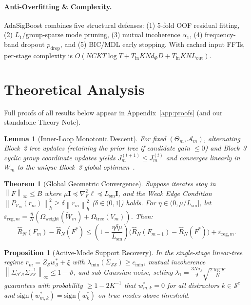 \documentclass[10pt]{article}
\newtheorem{theorem}{Theorem}
\newtheorem{lemma}{Lemma}
\newtheorem{proposition}{Proposition}
\newcommand{\norm}[1]{\left\lVert #1 \right\rVert}
\begin{document}
\paragraph{Anti-Overfitting \& Complexity.} AdaSigBoost combines five structural defenses: (1) 5-fold OOF residual fitting, (2) $L_1$/group-sparse mode pruning, (3) mutual incoherence $\alpha_1$, (4) frequency-band dropout $p_{\mathrm{drop}}$, and (5) BIC/MDL early stopping. With cached input FFTs, per-stage complexity is $O(NCKT\log T + T_{\mathrm{in}} K N d_\Phi D + T_{\mathrm{in}} K N L_{\mathrm{out}})$.

\section{Theoretical Analysis}
\label{sec:theory}
Full proofs of all results below appear in Appendix~\ref{app:proofs} (and our standalone Theory Note).

\begin{lemma}[Inner-Loop Monotonic Descent]
\label{lem:inner}
For fixed $(\Theta_m, \mathcal{A}_m)$, alternating Block~2 tree updates (retaining the prior tree if candidate gain $\le 0$) and Block~3 cyclic group coordinate updates yields $J_m^{(t+1)} \le J_m^{(t)}$ and converges linearly in $W_m$ to the unique Block~3 global optimum~\citep{tseng2001convergence}.
\end{lemma}

\begin{theorem}[Global Geometric Convergence]
\label{thm:conv}
Suppose iterates stay in $\norm{F}_\infty \le B$ where $\mu \mathbf{I} \preceq \nabla_F^2 \ell \preceq L_{\mathrm{sm}}\mathbf{I}$, and the Weak Edge Condition $\norm{P_{\mathcal{V}_m}(r_m)}_h^2 \ge \delta\norm{r_m}_h^2$ ($\delta \in (0,1]$) holds. For $\eta \in (0, \mu/L_{\mathrm{sm}}]$, let $\varepsilon_{\mathrm{reg},m} = \frac{\eta}{N}(\Omega_{\mathrm{weight}}(\tilde{W}_m) + \Omega_{\mathrm{tree}}(V_m))$. Then:
\[
    \hat{R}_N(F_m) - \hat{R}_N(F^*) \le \left(1 - \frac{\eta\delta\mu}{L_{\mathrm{sm}}}\right)\!\big(\hat{R}_N(F_{m-1}) - \hat{R}_N(F^*)\big) + \varepsilon_{\mathrm{reg},m}.
\]
\end{theorem}

\begin{proposition}[Active-Mode Support Recovery]
\label{prop:supp}
In the single-stage linear-tree regime $r_m = Z_{\mathcal{S}} w_{\mathcal{S}}^* + \xi$ with $\lambda_{\min}(\Sigma_{\mathcal{S}\mathcal{S}}) \ge c_{\min}$, mutual incoherence $\norm{\Sigma_{\mathcal{S}^c\mathcal{S}}\Sigma_{\mathcal{S}\mathcal{S}}^{-1}}_\infty \le 1-\vartheta$, and sub-Gaussian noise, setting $\lambda_1 = \frac{3N\sigma_\xi}{\vartheta}\sqrt{\frac{2\log K}{N}}$ guarantees with probability $\ge 1 - 2K^{-1}$ that $w_{m,k}^* = 0$ for all distractors $k \in \mathcal{S}^c$ and $\mathrm{sign}(w_{m,k}^*) = \mathrm{sign}(w_k^*)$ on true modes above threshold.
\end{proposition}
\end{document}
